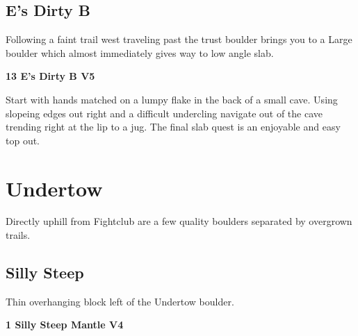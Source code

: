 \begin{multicols}{2}
			\subsection*{E's Dirty B}\label{bf:E's Dirty B}
			\begin{minipage}{\columnwidth}
			Following a faint trail west traveling past the trust boulder brings you to a Large boulder which almost immediately gives way to low angle slab.
			\end{minipage}
			

					\begin{minipage}{\linewidth}	
					\label{rt:E's Dirty B}
\colorbox{RoyalBlue!20}{
\parbox{0.95\textwidth}{
\textbf{
13 E's Dirty B V5    
}
}
}

					\begin{adjustwidth}{0.5cm}{}				
					Start with hands matched on a lumpy flake in the back of a small cave. Using slopeing edges out right and a difficult undercling navigate out of the cave trending right at the lip to a jug. The final slab quest is an enjoyable and easy top out.
					\end{adjustwidth}
					\end{minipage}
\newpage
		\section{Undertow}\label{sa:Undertow}
	\begin{minipage}{\columnwidth}
	Directly uphill from Fightclub are a few quality boulders separated by overgrown trails.
	\end{minipage}

			\subsection*{Silly Steep}\label{bf:Silly Steep}
			\begin{minipage}{\columnwidth}
			Thin overhanging block left of the Undertow boulder.
			\end{minipage}
			

					\begin{minipage}{\linewidth}	
					\label{rt:Silly Steep Mantle}
\colorbox{RoyalBlue!20}{
\parbox{0.95\textwidth}{
\textbf{
1 Silly Steep Mantle V4    
}
}
}


\end{minipage}
\end{multicols}
